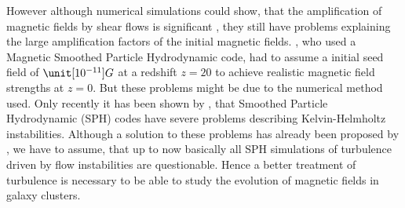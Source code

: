However although numerical simulations could show, that the amplification of
magnetic fields by shear flows is significant
\citep{Dolag2005a,Bruggen2005}, they still have problems explaining the large
amplification factors of the initial magnetic fields. \citet{Dolag2005a}, who
used a Magnetic Smoothed Particle Hydrodynamic code, had to assume a initial
seed field of $\unit[10^{-11}]{G}$ at a redshift $z=20$ to achieve realistic
magnetic field strengths at $z=0$. But these problems might be due to the
numerical method used. Only recently it has been shown by \citet{Agertz2007},
that Smoothed Particle Hydrodynamic (SPH) codes have severe problems describing
Kelvin-Helmholtz instabilities. Although a solution to these problems has
already been proposed by \citet{Price2007}, we have to assume, that up
to now basically all SPH simulations of turbulence driven by flow instabilities
are questionable. Hence a better treatment of turbulence is necessary to
be able to study the evolution of magnetic fields in galaxy clusters. 

